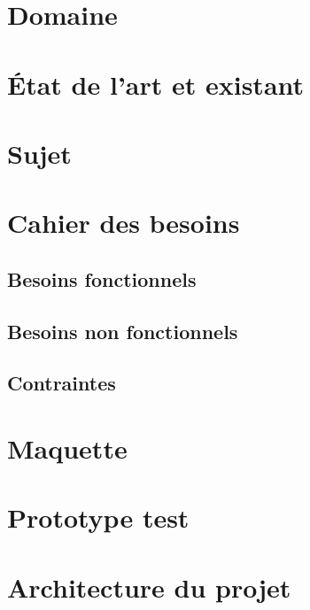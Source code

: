 \documentclass[paper=a4, fontsize=11pt]{article}
\newenvironment{changemargin}[2]{\begin{list}{}{%
\setlength{\topsep}{0pt}%
\setlength{\leftmargin}{0pt}%
\setlength{\rightmargin}{0pt}%
\setlength{\listparindent}{\parindent}%
\setlength{\itemindent}{\parindent}%
\setlength{\parsep}{0pt plus 1pt}%
\addtolength{\leftmargin}{#1}%
\addtolength{\rightmargin}{#2}%
}\item }{\end{list}}
\numberwithin{equation}{section}		%
\numberwithin{figure}{section}			%
\numberwithin{table}{section}				%
\begin{document}
\begin{changemargin}{-1cm}{-1cm}

\section{Domaine}


\section{État de l'art et existant}


\section{Sujet}


\section{Cahier des besoins}
\subsection{Besoins fonctionnels}

\subsection{Besoins non fonctionnels}

\subsection{Contraintes}

%
\section{Maquette}

\section{Prototype test}\label{sec:prototypetest}

\section{Architecture du projet}\label{sec:archi}



\end{changemargin}
\end{document}
